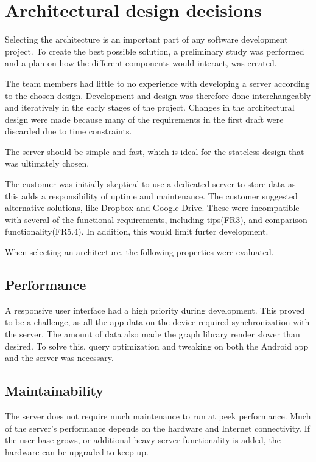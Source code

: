 \section{Architectural design decisions}
\label{sec:arch_design}
Selecting the architecture is an important part of any software development project. To create the best possible solution, a preliminary study was performed and a plan on how the different components would interact, was created. 

The team members had little to no experience with developing a server according to the chosen design. Development and design was therefore done interchangeably and iteratively in the early stages of the project. Changes in the architectural design were made because many of the requirements in the first draft were discarded due to time constraints.

The server should be simple and fast, which is ideal for the stateless design that was ultimately chosen. 

The customer was initially skeptical to use a dedicated server to store data as this adds a responsibility of uptime and maintenance. The customer suggested alternative solutions, like Dropbox and Google Drive.
These were incompatible with several of the functional requirements, including tips(FR3), and comparison functionality(FR5.4). In addition, this would limit furter development. 

When selecting an architecture, the following properties were evaluated. 

\subsection{Performance}
A responsive user interface had a high priority during development. This proved to be a challenge, as all the app data on the device required synchronization with the server. The amount of data also made the graph library render slower than desired. To solve this, query optimization and tweaking on both the Android app and the server was necessary.

\subsection{Maintainability}
The server does not require much maintenance to run at peek performance. Much of the server's performance depends on the hardware and Internet connectivity. If the user base grows, or additional heavy server functionality is added, the hardware can be upgraded to keep up.

